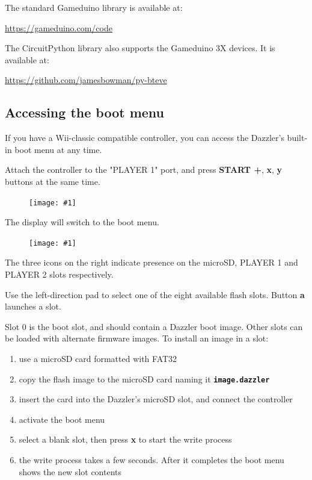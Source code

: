 \documentclass{article}
\newcommand{\pngw}[2]{
\begin{figure}[H]
\begin{center}
\texttt{[image: \#1]}
\end{center}
\end{figure}
}
\newcommand{\mach}[1]{\texttt{\textbf{#1}}}
\begin{document}
The standard Gameduino library is available at:

\url{https://gameduino.com/code}

The CircuitPython library also supports the Gameduino 3X devices.
It is available at:

\url{https://github.com/jamesbowman/py-bteve}

\newpage
\subsection{Accessing the boot menu}\label{sec:bootmenu}

If you have a Wii-classic compatible controller,
you can access the Dazzler's built-in boot menu at any time.

Attach the controller to the "PLAYER 1" port, and press
\textbf{START +},
\textbf{x},
\textbf{y} buttons at the same time.

\pngw{img/gameduino-3x-dazzler/wii-bootmenu.png}{0.5}

The display will switch to the boot menu.

\pngw{img/gameduino-3x-dazzler/bootmenu1.png}{0.7}

The three icons on the right indicate presence on the
microSD, PLAYER 1 and PLAYER 2 slots respectively.

Use the left-direction pad to select one of the eight available flash slots.
Button \textbf{a} launches a slot.

Slot 0 is the boot slot, and should contain a Dazzler boot image. Other slots can be loaded with alternate firmware images.
To install an image in a slot: 

\begin{enumerate}

\item use a microSD card formatted with FAT32

\item copy the flash image to the microSD card naming it \mach{image.dazzler}

\item insert the card into the Dazzler's microSD slot, and connect the controller

\item activate the boot menu

\item select a blank slot, then press \textbf{x} to start the write process

\item the write process takes a few seconds.
After it completes the boot menu shows the new slot contents

\end{enumerate}
\end{document}
